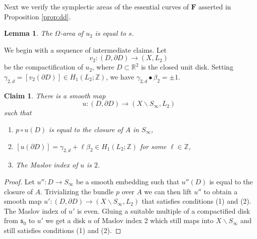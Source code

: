 \documentclass[12pt]{amsart}
\newtheorem{lemma}[theorem]{Lemma}
\newtheorem{claim}[theorem]{Claim}
\theoremstyle{definition}
\newcommand{\RR}{{\mathbb R}}
\newcommand{\ZZ}{{\mathbb Z}}
\begin{document}
\bigskip


 Next we verify the symplectic areas of the essential curves of $\mathbf{F}$ asserted in Proposition \ref{prop:dd}. %

\begin{lemma}\label{lem:s}
The $\Omega$-area of   $u_2$ is equal to $s$.
\end{lemma}

 We begin with a sequence of intermediate claims. Let $$v_2 \colon (D,\partial D) \to (X , L_2)$$ be the compactification of $u_2$, where  $D \subset \RR^2$ is the closed unit disk. Setting $\gamma_{2,d} = [v_2(\partial D)]  \in H_1(L_2;\ZZ)$, we have $\gamma_{2,d} \bullet \beta_2 =\pm 1.$

\begin{claim}\label{claim:u}
    There is a  smooth map $$u \colon (D,\partial D) \to (X \smallsetminus S_\infty, L_2)$$ such that 
    \begin{enumerate}
         \item $p \circ u (D)$  is equal to the closure of $A$ in $S_{\infty}$,
         \item $[u(\partial D)] =\gamma_{2,d} + \ell \beta_2 \in H_1(L_2; \ZZ)$ for some $\ell \in \ZZ$,
        \item The Maslov index of $u$ is $2$.
        
    \end{enumerate}
\end{claim}
\begin{proof} 


Let $u'' \colon D \to  S_{\infty}$ be a smooth embedding such that $u''(D)$ is equal to the closure of $A$. 
Trivializing the bundle $p$ over $A$ we can then lift $u''$ to obtain a smooth map $u' \colon (D,\partial D) \to (X \smallsetminus S_\infty, L_2)$ that satisfies conditions (1) and (2). The Maslov index of $u'$ is even. Gluing a suitable multiple of a compactified disk from $\mathfrak{s}_0$ to $u'$ we get a disk $u$ of Maslov index 2 which still maps into $X \smallsetminus S_\infty$ and still satisfies conditions (1) and (2).

\end{proof}
\end{document}
